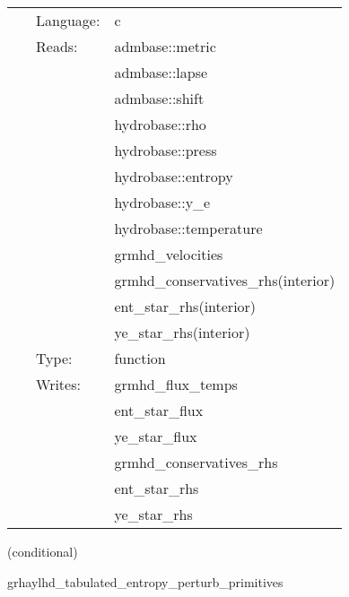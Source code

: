 \documentclass{article}
\begin{document}
 \begin{tabular*}{160mm}{cll} 
~ & Language:  & c \\ 
~ & Reads:  & admbase::metric \\ 
~& ~ &admbase::lapse\\ 
~& ~ &admbase::shift\\ 
~& ~ &hydrobase::rho\\ 
~& ~ &hydrobase::press\\ 
~& ~ &hydrobase::entropy\\ 
~& ~ &hydrobase::y\_e\\ 
~& ~ &hydrobase::temperature\\ 
~& ~ &grmhd\_velocities\\ 
~& ~ &grmhd\_conservatives\_rhs(interior)\\ 
~& ~ &ent\_star\_rhs(interior)\\ 
~& ~ &ye\_star\_rhs(interior)\\ 
~ & Type:  & function \\ 
~ & Writes:  & grmhd\_flux\_temps \\ 
~& ~ &ent\_star\_flux\\ 
~& ~ &ye\_star\_flux\\ 
~& ~ &grmhd\_conservatives\_rhs\\ 
~& ~ &ent\_star\_rhs\\ 
~& ~ &ye\_star\_rhs\\ 
\end{tabular*} 


\vspace{5mm}

   (conditional) 

\hspace{5mm} grhaylhd\_tabulated\_entropy\_perturb\_primitives 

\hspace{5mm}{\it entropy+tabulated version of grhaylhd\_perturb\_primitives } 


\hspace{5mm}
\end{document}
